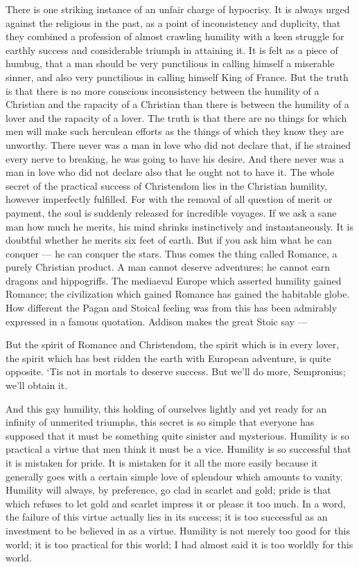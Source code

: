 There is one striking instance of an unfair charge of hypocrisy. It is always urged against the religious in the past, as a point of inconsistency and duplicity, that they combined a profession of almost crawling humility with a keen struggle for earthly success and considerable triumph in attaining it. It is felt as a piece of humbug, that a man should be very punctilious in calling himself a miserable sinner, and also very punctilious in calling himself King of France. But the truth is that there is no more conscious inconsistency between the humility of a Christian and the rapacity of a Christian than there is between the humility of a lover and the rapacity of a lover. The truth is that there are no things for which men will make such herculean efforts as the things of which they know they are unworthy. There never was a man in love who did not declare that, if he strained every nerve to breaking, he was going to have his desire. And there never was a man in love who did not declare also that he ought not to have it. The whole secret of the practical success of Christendom lies in the Christian humility, however imperfectly fulfilled. For with the removal of all question of merit or payment, the soul is suddenly released for incredible voyages. If we ask a sane man how much he merits, his mind shrinks instinctively and instantaneously. It is doubtful whether he merits six feet of earth. But if you ask him what he can conquer — he can conquer the stars. Thus comes the thing called Romance, a purely Christian product. A man cannot deserve adventures; he cannot earn dragons and hippogriffs. The mediaeval Europe which asserted humility gained Romance; the civilization which gained Romance has gained the habitable globe. How different the Pagan and Stoical feeling was from this has been admirably expressed in a famous quotation. Addison makes the great Stoic say —

But the spirit of Romance and Christendom, the spirit which is in every lover, the spirit which has best ridden the earth with European adventure, is quite opposite. ‘Tis not in mortals to deserve success. But we’ll do more, Sempronius; we’ll obtain it.

And this gay humility, this holding of ourselves lightly and yet ready for an infinity of unmerited triumphs, this secret is so simple that everyone has supposed that it must be something quite sinister and mysterious. Humility is so practical a virtue that men think it must be a vice. Humility is so successful that it is mistaken for pride. It is mistaken for it all the more easily because it generally goes with a certain simple love of splendour which amounts to vanity. Humility will always, by preference, go clad in scarlet and gold; pride is that which refuses to let gold and scarlet impress it or please it too much. In a word, the failure of this virtue actually lies in its success; it is too successful as an investment to be believed in as a virtue. Humility is not merely too good for this world; it is too practical for this world; I had almost said it is too worldly for this world.

